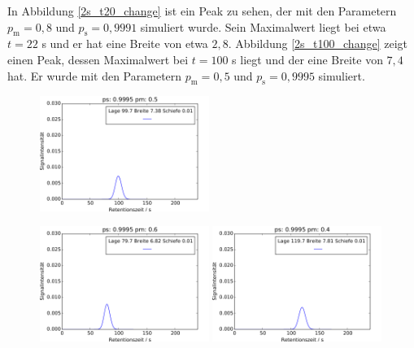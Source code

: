In Abbildung \ref{2s_t20_change} ist ein Peak zu sehen, der mit den Parametern $p_{\text{m}} = 0,8$ und $p_{\text{s}} = 0,9991$ simuliert wurde. Sein Maximalwert liegt bei etwa $t = 22$ s und er hat eine Breite von etwa $2,8$. Abbildung \ref{2s_t100_change} zeigt einen Peak, dessen Maximalwert bei $t=100$ s liegt und der eine Breite von $7,4$ hat. Er wurde mit den Parametern $p_{\text{m}} = 0,5$ und $p_{\text{s}} = 0,9995$ simuliert.
\begin{figure}[h]
\begin{center}
\includegraphics[width=0.49\textwidth]{bilder/2s_einzeleinfluss/2s_t100}
\end{center}
\includegraphics[width=0.49\textwidth]{bilder/2s_einzeleinfluss/2s_t100_pmp}
\includegraphics[width=0.49\textwidth]{bilder/2s_einzeleinfluss/2s_t100_pmm}

\vspace*{5pt}


\end{figure}
